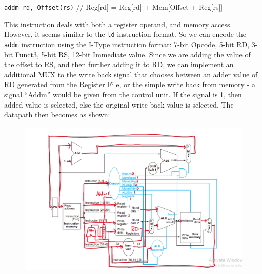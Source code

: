 \documentclass[addpoints]{exam}
\begin{document}
\begin{sloppypar}
\begin{questions}
\begin{solution}
\begin{parts}
            \texttt{addm rd, Offset(rs)} \hspace*{5mm} // Reg[rd] = Reg[rd] + Mem[Offset + Reg[rs]]
            \begin{subparts}
                \renewcommand{\thesubpart}{\alph{subpart}}
                \subpart This instruction deals with both a register operand, and memory access. However, it seems similar to the \texttt{ld} instruction format. So we can encode the \texttt{addm} instruction using the I-Type instruction format: 7-bit Opcode, 5-bit RD, 3-bit Funct3, 5-bit RS, 12-bit Immediate value.
                \subpart Since we are adding the value of the offset to RS, and then further adding it to RD, we can implement an additional MUX to the write back signal that chooses between an adder value of RD generated from the Register File, or the simple write back from memory - a signal ``Addm'' would be given from the control unit. If the signal is 1, then added value is selected, else the original write back value is selected. The datapath then becomes as shown: 
                \begin{figure}[H]
                    \centering
                    \includegraphics[scale = 0.5]{Q7_b_addtomem.png}
                \end{figure}
                

\end{subparts}
\end{parts}
\end{solution}
\end{questions}
\end{sloppypar}
\end{document}
